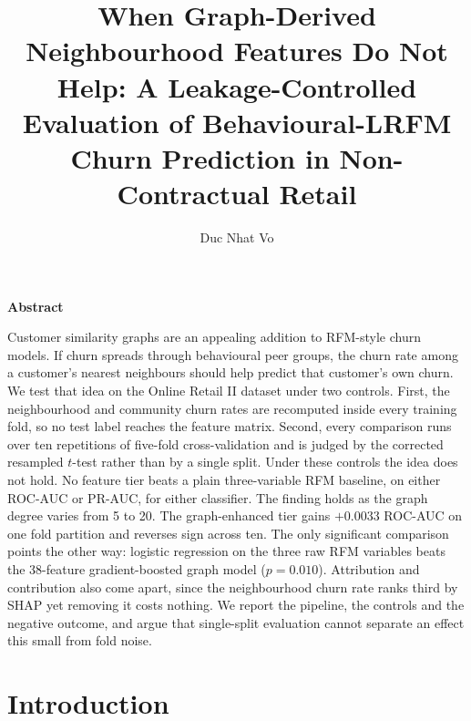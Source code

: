\documentclass[runningheads]{llncs}
\makeatletter
\def\abstractname{Abstract}
\renewenvironment{abstract}{%
  \list{}{\advance\topsep by0.35cm\relax\small
    \leftmargin=\z@
    \rightmargin=\z@
    \labelwidth=\z@
    \listparindent=\z@
    \itemindent=\z@}%
  \item[]{\centering\bfseries\abstractname\par}\nobreak\vskip 3pt\noindent\ignorespaces}%
  {\endlist}
\makeatother
\begin{document}
\title{When Graph-Derived Neighbourhood Features Do Not Help:
A Leakage-Controlled Evaluation of Behavioural-LRFM Churn Prediction
in Non-Contractual Retail}


\author{Duc Nhat Vo}
\authorrunning{~}

\maketitle

\begin{abstract}
Customer similarity graphs are an appealing addition to RFM-style churn models.
If churn spreads through behavioural peer groups, the churn rate among a
customer's nearest neighbours should help predict that customer's own churn. We
test that idea on the Online Retail II dataset under two controls. First, the
neighbourhood and community churn rates are recomputed inside every training
fold, so no test label reaches the feature matrix. Second, every comparison runs
over ten repetitions of five-fold cross-validation and is judged by the corrected
resampled $t$-test rather than by a single split. Under these controls the idea
does not hold. No feature tier beats a plain three-variable RFM baseline, on
either ROC-AUC or PR-AUC, for either classifier. The finding holds as the graph degree varies from 5 to 20. The graph-enhanced tier gains
$+0.0033$ ROC-AUC on one fold partition and reverses sign across ten. The only
significant comparison points the other way: logistic regression on the three raw
RFM variables beats the 38-feature gradient-boosted graph model ($p = 0.010$).
Attribution and contribution also come apart, since the neighbourhood churn rate
ranks third by SHAP yet removing it costs nothing. We report the pipeline, the
controls and the negative outcome, and argue that single-split evaluation cannot
separate an effect this small from fold noise.

\end{abstract}

\section{Introduction}
\end{document}

